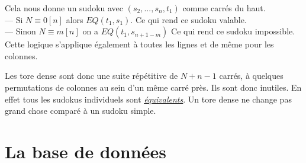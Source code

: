 \documentclass[a4paper]{article}
\begin{document}
\begin{justify}
\begin{itemize}
        Cela nous donne un sudoku avec $(s_2,...,s_n,t_1)$ comme carrés du haut. \\
        — Si $N\equiv0[n]$ alors $EQ(t_1, s_1)$. Ce qui rend ce  sudoku valable. \\
        — Sinon $N\equiv m[n]$ on a $EQ(t_1, s_{n+1-m})$ Ce qui rend ce sudoku impossible. \mbox{}\\[0.5em]
        Cette logique s'applique également à toutes les lignes et de même pour les colonnes. \bigskip
    \end{itemize}

    \noindent Les tore dense sont donc une suite répétitive de $N+n-1$ carrés, à quelques permutations de colonnes au sein d'un même carré près. Ils sont donc inutiles. En effet tous les sudokus individuels sont \hyperlink{canonisation}{\uline{\textit{équivalents}}}. Un tore dense ne change pas grand chose comparé à un sudoku simple.
\end{justify}

\newpage
\section{La base de données}
\end{document}
